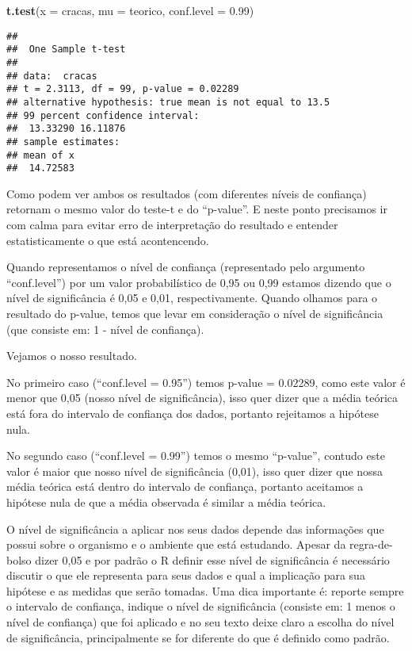 \documentclass[]{book}
\newenvironment{Shaded}{\begin{snugshade}}{\end{snugshade}}
\newcommand{\DataTypeTok}[1]{\textcolor[rgb]{0.13,0.29,0.53}{#1}}
\newcommand{\FloatTok}[1]{\textcolor[rgb]{0.00,0.00,0.81}{#1}}
\newcommand{\KeywordTok}[1]{\textcolor[rgb]{0.13,0.29,0.53}{\textbf{#1}}}
\newcommand{\NormalTok}[1]{#1}
\begin{document}
\begin{Shaded}
\begin{Highlighting}[]
\KeywordTok{t.test}\NormalTok{(}\DataTypeTok{x =}\NormalTok{ cracas, }\DataTypeTok{mu =}\NormalTok{ teorico, }\DataTypeTok{conf.level =} \FloatTok{0.99}\NormalTok{)}
\end{Highlighting}
\end{Shaded}

\begin{verbatim}
## 
##  One Sample t-test
## 
## data:  cracas
## t = 2.3113, df = 99, p-value = 0.02289
## alternative hypothesis: true mean is not equal to 13.5
## 99 percent confidence interval:
##  13.33290 16.11876
## sample estimates:
## mean of x 
##  14.72583
\end{verbatim}

Como podem ver ambos os resultados (com diferentes níveis de confiança) retornam o mesmo valor do teste-t e do ``p-value''. E neste ponto precisamos ir com calma para evitar erro de interpretação do resultado e entender estatisticamente o que está acontencendo.

Quando representamos o nível de confiança (representado pelo argumento ``conf.level'') por um valor probabilístico de 0,95 ou 0,99 estamos dizendo que o nível de significância é 0,05 e 0,01, respectivamente. Quando olhamos para o resultado do p-value, temos que levar em consideração o nível de significância (que consiste em: 1 - nível de confiança).

Vejamos o nosso resultado.

No primeiro caso (``conf.level = 0.95'') temos p-value = 0.02289, como este valor é menor que 0,05 (nosso nível de significância), isso quer dizer que a média teórica está fora do intervalo de confiança dos dados, portanto rejeitamos a hipótese nula.

No segundo caso (``conf.level = 0.99'') temos o mesmo ``p-value'', contudo este valor é maior que nosso nível de significância (0,01), isso quer dizer que nossa média teórica está dentro do intervalo de confiança, portanto aceitamos a hipótese nula de que a média observada é similar a média teórica.

O nível de significância a aplicar nos seus dados depende das informações que possui sobre o organismo e o ambiente que está estudando. Apesar da regra-de-bolso dizer 0,05 e por padrão o R definir esse nível de significância é necessário discutir o que ele representa para seus dados e qual a implicação para sua hipótese e as medidas que serão tomadas. Uma dica importante é: reporte sempre o intervalo de confiança, indique o nível de significância (consiste em: 1 menos o nível de confiança) que foi aplicado e no seu texto deixe claro a escolha do nível de significância, principalmente se for diferente do que é definido como padrão.
\end{document}
